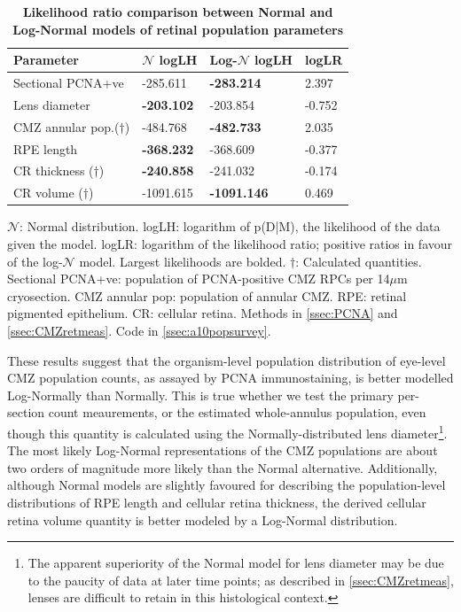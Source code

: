 \documentclass{ut-thesis}
\begin{document}
\begin{NoHyper}
\begin{table}[!ht]
    \centering
    \caption{
    {\bf Likelihood ratio comparison between Normal and Log-Normal models of retinal population parameters}}
    \begin{tabular}{|l|l|l|l|}
    \hline
    {\bf Parameter} & {\bf $\mathcal{N}$ logLH} & {\bf Log-$\mathcal{N}$ logLH} & {\bf logLR} \\ \hline
    Sectional PCNA+ve & -285.611 & {\bf -283.214} & 2.397\\ \hline
    Lens diameter & {\bf -203.102} & -203.854 & -0.752\\ \hline
    CMZ annular pop.($\dagger$)  & -484.768 & {\bf -482.733} & 2.035\\ \hline
    RPE length & {\bf -368.232} & -368.609 & -0.377\\ \hline
    CR thickness ($\dagger$) & {\bf -240.858} & -241.032 & -0.174\\ \hline
    CR volume ($\dagger$) & -1091.615 & {\bf -1091.146} & 0.469\\ \hline
    \end{tabular}
    \begin{flushleft} $\mathcal{N}$: Normal distribution. logLH: logarithm of p(D|M), the likelihood of the data given the model. logLR: logarithm of the likelihood ratio; positive ratios in favour of the log-$\mathcal{N}$ model. Largest likelihoods are bolded. $\dagger$: Calculated quantities. Sectional PCNA+ve: population of PCNA-positive CMZ RPCs per 14$\mu$m cryosection. CMZ annular pop: population of annular CMZ. RPE: retinal pigmented epithelium. CR: cellular retina.
    Methods in \autoref{ssec:PCNA} and \autoref{ssec:CMZretmeas}.
    Code in \autoref{ssec:a10popsurvey}.
    \end{flushleft}
    \label{PLHRtable}
\end{table}

These results suggest that the organism-level population distribution of eye-level CMZ population counts, as assayed by PCNA immunostaining, is better modelled Log-Normally than Normally. This is true whether we test the primary per-section count meaurements, or the estimated whole-annulus population, even though this quantity is calculated using the Normally-distributed lens diameter\footnote{The apparent superiority of the Normal model for lens diameter may be due to the paucity of data at later time points; as described in \autoref{ssec:CMZretmeas}, lenses are difficult to retain in this histological context.}. The most likely Log-Normal representations of the CMZ populations are about two orders of magnitude more likely than the Normal alternative. Additionally, although Normal models are slightly favoured for describing the population-level distributions of RPE length and cellular retina thickness, the derived cellular retina volume quantity is better modeled by a Log-Normal distribution. 


\end{NoHyper}
\end{document}

